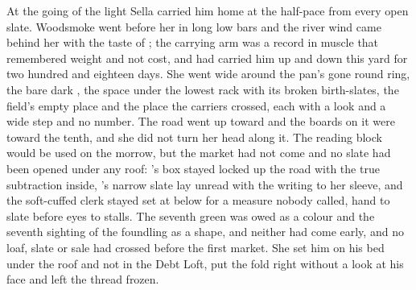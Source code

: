 At the going of the light Sella carried him home at the half-pace from every open slate. Woodsmoke went before her in long low bars and the river wind came behind her with the taste of ; the carrying arm was a record in muscle that remembered weight and not cost, and had carried him up and down this yard for two hundred and eighteen days. She went wide around the pan's gone round ring, the bare dark , the space under the lowest rack with its broken birth-slates, the field's empty place and the place the carriers crossed, each with a look and a wide step and no number. The road went up toward  and the boards on it were toward the tenth, and she did not turn her head along it. The reading block would be used on the morrow, but the market had not come and no slate had been opened under any roof: 's box stayed locked up the road with the true subtraction inside, 's narrow slate lay unread with the writing to her sleeve, and the soft-cuffed clerk stayed set at  below  for a measure nobody called, hand to slate before eyes to stalls. The seventh green was owed as a colour and the seventh sighting of the foundling as a shape, and neither had come early, and no loaf, slate or sale had crossed  before the first market. She set him on his bed under the roof and not in the Debt Loft, put the fold right without a look at his face and left the thread frozen.

\scenebreak

